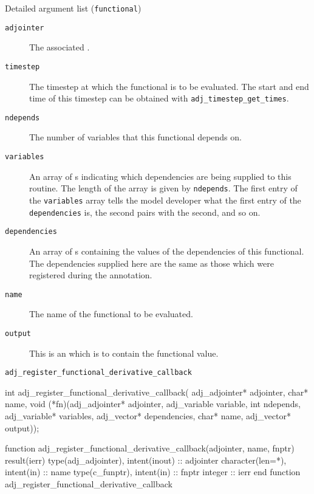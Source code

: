 \begin{boxwithtitle}{Detailed argument list (\texttt{functional})}
\begin{description}
\item[\texttt{adjointer}] The associated .
\item[\texttt{timestep}] The timestep at which the functional is to be evaluated. The start and end time of this timestep can be obtained with \texttt{adj_timestep_get_times}.
\item[\texttt{ndepends}] The number of variables that this functional depends on.
\item[\texttt{variables}] An array of s indicating which dependencies are being supplied to this routine. The length of the
array is given by \texttt{ndepends}. The first entry of the \texttt{variables} array
tells the model developer what the first entry of the \texttt{dependencies} is, the second pairs with the second, and so on.
\item[\texttt{dependencies}] An array of s containing the values of the dependencies of this functional. The dependencies supplied
here are the same as those which were registered during the annotation.
\item[\texttt{name}] The name of the functional to be evaluated.
\item[\texttt{output}] This is an  which is to contain the functional value. 
\end{description}
\end{boxwithtitle}


\begin{boxwithtitle}{\texttt{adj_register_functional_derivative_callback}}
\begin{minipage}{\columnwidth}
\begin{ccode}
int adj_register_functional_derivative_callback(
                    adj_adjointer* adjointer, char* name, 
                    void (*fn)(adj_adjointer* adjointer, 
                               adj_variable variable, int ndepends, 
                               adj_variable* variables, adj_vector* dependencies, 
                               char* name, adj_vector* output));
\end{ccode}
\begin{fortrancode}
function adj_register_functional_derivative_callback(adjointer, name, fnptr) 
                                                                      result(ierr)
  type(adj_adjointer), intent(inout) :: adjointer
  character(len=*), intent(in) :: name
  type(c_funptr), intent(in) :: fnptr
  integer :: ierr
end function adj_register_functional_derivative_callback
\end{fortrancode}
\end{minipage}
\end{boxwithtitle}

